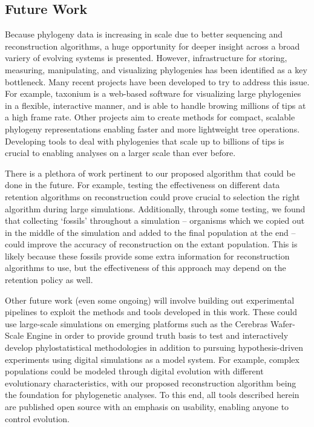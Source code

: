\subsection{Future Work} \label{sec:conclusion:future}

Because phylogeny data is increasing in scale due to better sequencing and reconstruction algorithms, a huge opportunity for deeper insight across a broad variery of evolving systems is presented.
However, infrastructure for storing, measuring, manipulating, and visualizing phylogenies has been identified as a key bottleneck.
Many recent projects have been developed to try to address this issue.
For example, taxonium \citep{sanderson2022taxonium} is a web-based software for visualizing large phylogenies in a flexible, interactive manner, and is able to handle browing millions of tips at a high frame rate.
Other projects aim to create methods for compact, scalable phylogeny representations \citep{moshiri2025compacttree, moshiri2020treeswift} enabling faster and more lightweight tree operations.
Developing tools to deal with phylogenies that scale up to billions of tips is crucial to enabling analyses on a larger scale than ever before.

There is a plethora of work pertinent to our proposed algorithm that could be done in the future.
For example, testing the effectiveness on different data retention algorithms on reconstruction could prove crucial to selection the right algorithm during large simulations.
Additionally, through some testing, we found that collecting `fossils' throughout a simulation -- organisms which we copied out in the middle of the simulation and added to the final population at the end -- could improve the accuracy of reconstruction on the extant population.
This is likely because these fossils provide some extra information for reconstruction algorithms to use, but the effectiveness of this approach may depend on the retention policy as well.

Other future work (even some ongoing) will involve building out experimental pipelines to exploit the methods and tools developed in this work.
These could use large-scale simulations on emerging platforms such as the Cerebras Wafer-Scale Engine in order to provide ground truth basis to test and interactively develop phylostatistical methodologies in addition to pursuing hypothesis-driven experiments using digital simulations as a model system.
For example, complex populations could be modeled through digital evolution with different evolutionary characteristics, with our proposed reconstruction algorithm being the foundation for phylogenetic analyses.
To this end, all tools described herein are published open source \citep{moreno2024hstrat} with an emphasis on usability, enabling anyone to control evolution.
